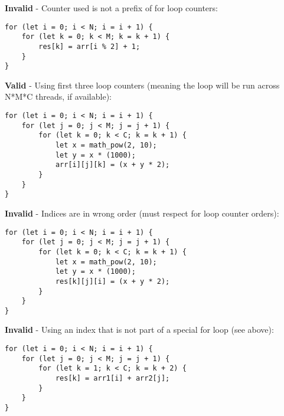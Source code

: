 \textbf{Invalid} - Counter used is not a prefix of for loop counters:
\begin{verbatim}
for (let i = 0; i < N; i = i + 1) {
    for (let k = 0; k < M; k = k + 1) {
        res[k] = arr[i % 2] + 1;
    }
}
\end{verbatim}

\textbf{Valid} - Using first three loop counters (meaning the loop will be run across N*M*C threads, if available):
\begin{verbatim}
for (let i = 0; i < N; i = i + 1) {
    for (let j = 0; j < M; j = j + 1) {
        for (let k = 0; k < C; k = k + 1) {
            let x = math_pow(2, 10);
            let y = x * (1000);
            arr[i][j][k] = (x + y * 2);
        }
    }
}
\end{verbatim}

\textbf{Invalid} - Indices are in wrong order (must respect for loop counter orders):
\begin{verbatim}
for (let i = 0; i < N; i = i + 1) {
    for (let j = 0; j < M; j = j + 1) {
        for (let k = 0; k < C; k = k + 1) {
            let x = math_pow(2, 10);
            let y = x * (1000);
            res[k][j][i] = (x + y * 2);
        }
    }
}
\end{verbatim}

\textbf{Invalid} - Using an index that is not part of a special for loop (see above):
\begin{verbatim}
for (let i = 0; i < N; i = i + 1) {
    for (let j = 0; j < M; j = j + 1) {
        for (let k = 1; k < C; k = k + 2) {
            res[k] = arr1[i] + arr2[j];
        }
    }
}
\end{verbatim}

\newpage



\newpage





